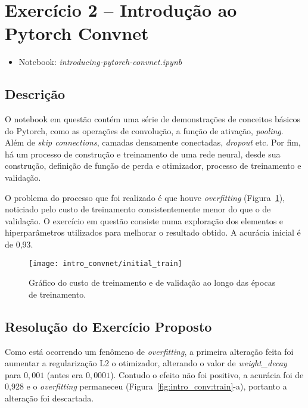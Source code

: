 \section{Exercício 2 -- Introdução ao Pytorch Convnet}

\begin{itemize}
	\item Notebook: \textit{introducing-pytorch-convnet.ipynb}
\end{itemize}

\subsection{Descrição}

O notebook em questão contém uma série de demonstrações de conceitos básicos do Pytorch, como as operações de convolução, a função de ativação, \textit{pooling}. Além de \textit{skip connections}, camadas densamente conectadas, \textit{dropout} etc. Por fim, há um processo de construção e treinamento de uma rede neural, desde sua construção, definição de função de perda e otimizador, processo de treinamento e validação.

O problema do processo que foi realizado é que houve \textit{overfitting} (Figura~\ref{fig:note2:init_train}), noticiado pelo custo de treinamento consistentemente menor do que o de validação. O exercício em questão consiste numa exploração dos elementos e hiperparâmetros utilizados para melhorar o resultado obtido. A acurácia inicial é de 0,93.

\begin{figure}[!htb]
	\centering
	\texttt{[image: intro\_convnet/initial\_train]}
	\caption{Gráfico do custo de treinamento e de validação ao longo das épocas de treinamento.}
	\label{fig:note2:init_train}
\end{figure}

\subsection{Resolução do Exercício Proposto}

Como está ocorrendo um fenômeno de \textit{overfitting}, a primeira alteração feita foi aumentar a regularização L2 o otimizador, alterando o valor de \textit{weight\_decay} para $0,001$ (antes era $0,0001$). Contudo o efeito não foi positivo, a acurácia foi de 0,928 e o \textit{overfitting} permaneceu (Figura~\ref{fig:intro_conv:train}-a), portanto a alteração foi descartada.


